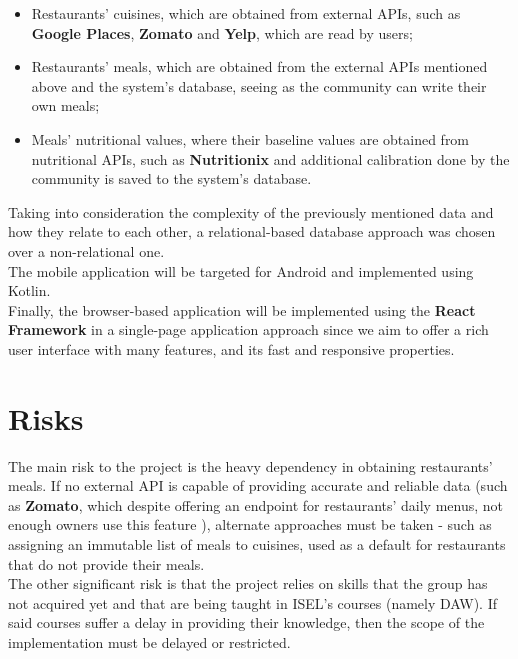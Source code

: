 \documentclass{article}
\begin{document}
\begin{itemize}
    \item Restaurants' cuisines, which are obtained from external APIs, such as \textbf{Google Places}\cite{googleplaces}, \textbf{Zomato}\cite{zomato} and \textbf{Yelp}\cite{yelp}, which are read by users; 
    \item Restaurants' meals, which are obtained from the external APIs mentioned above and the system's database, seeing as the community can write their own meals;  
    \item Meals' nutritional values, where their baseline values are obtained from nutritional APIs, such as \textbf{Nutritionix}\cite{nutritionix} and additional calibration done by the community is saved to the system's database.
\end{itemize}

Taking into consideration the complexity of the previously mentioned data and how they relate to each other, a relational-based database approach was chosen over a non-relational one.\\

The mobile application will be targeted for Android and implemented using Kotlin.\\

Finally, the browser-based application will be implemented using the \textbf{React Framework}\cite{react} in a single-page application approach since we aim to offer a rich user interface with many features, and its fast and responsive properties.\cite{singlepage1}\cite{singlepage2}\\

\section{Risks}

The main risk to the project is the heavy dependency in obtaining restaurants' meals. If no external API is capable of providing accurate and reliable data (such as \textbf{Zomato}\cite{zomato}, which despite offering an endpoint for restaurants' daily menus, not enough owners use this feature \cite{zomato1}\cite{zomato2}\cite{zomato3}), alternate approaches must be taken - such as assigning an immutable list of meals to cuisines, used as a default for restaurants that do not provide their meals.\\

The other significant risk is that the project relies on skills that the group has not acquired yet and that are being taught in ISEL's courses (namely DAW). If said courses suffer a delay in providing their knowledge, then the scope of the implementation must be delayed or restricted.\\
\end{document}
